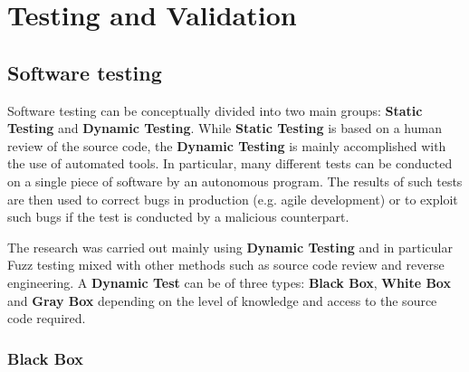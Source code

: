 \documentclass[../main.tex]{subfiles}
\begin{document}
\chapter{Testing and Validation}

\label{chap:fuzzing}

\section{Software testing}

Software testing can be conceptually divided into two main groups: \textbf{Static Testing} and \textbf{Dynamic Testing}. While \textbf{Static Testing} is based on a human review of the source code, the \textbf{Dynamic Testing} is mainly accomplished with the use of automated tools. In particular, many different tests can be conducted on a single piece of software by an autonomous program. The results of such tests are then used to correct bugs in production (e.g. agile development) or to exploit such bugs if the test is conducted by a malicious counterpart.

The research was carried out mainly using \textbf{Dynamic Testing} and in particular Fuzz testing mixed with other methods such as source code review and reverse engineering. A \textbf{Dynamic Test} can be of three types: \textbf{Black Box}, \textbf{White Box} and \textbf{Gray Box} depending on the level of knowledge and access to the source code required.

\subsection{Black Box}
\end{document}

